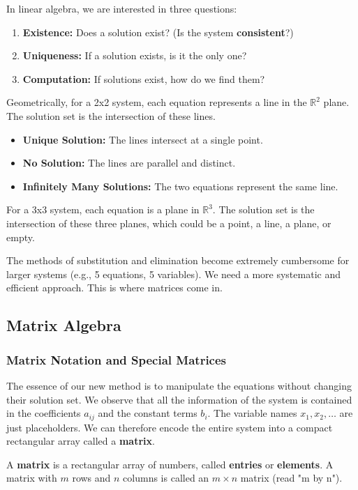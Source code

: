 In linear algebra, we are interested in three questions:
\begin{enumerate}
    \item \textbf{Existence:} Does a solution exist? (Is the system \textbf{consistent}?)
    \item \textbf{Uniqueness:} If a solution exists, is it the only one?
    \item \textbf{Computation:} If solutions exist, how do we find them?
\end{enumerate}

Geometrically, for a 2x2 system, each equation represents a line in the $\mathbb{R}^2$ plane. The solution set is the intersection of these lines.
\begin{itemize}
    \item \textbf{Unique Solution:} The lines intersect at a single point.
    \item \textbf{No Solution:} The lines are parallel and distinct.
    \item \textbf{Infinitely Many Solutions:} The two equations represent the same line.
\end{itemize}
% 

For a 3x3 system, each equation is a plane in $\mathbb{R}^3$. The solution set is the intersection of these three planes, which could be a point, a line, a plane, or empty.
% 

The methods of substitution and elimination become extremely cumbersome for larger systems (e.g., 5 equations, 5 variables). We need a more systematic and efficient approach. This is where matrices come in.

\subsection{Matrix Algebra}

\subsubsection{Matrix Notation and Special Matrices}

The essence of our new method is to manipulate the equations without changing their solution set. We observe that all the information of the system is contained in the coefficients $a_{ij}$ and the constant terms $b_i$. The variable names $x_1, x_2, \ldots$ are just placeholders. We can therefore encode the entire system into a compact rectangular array called a \textbf{matrix}.

\begin{definition}
A \textbf{matrix} is a rectangular array of numbers, called \textbf{entries} or \textbf{elements}. A matrix with $m$ rows and $n$ columns is called an $m \times n$ matrix (read "m by n").
\end{definition}

